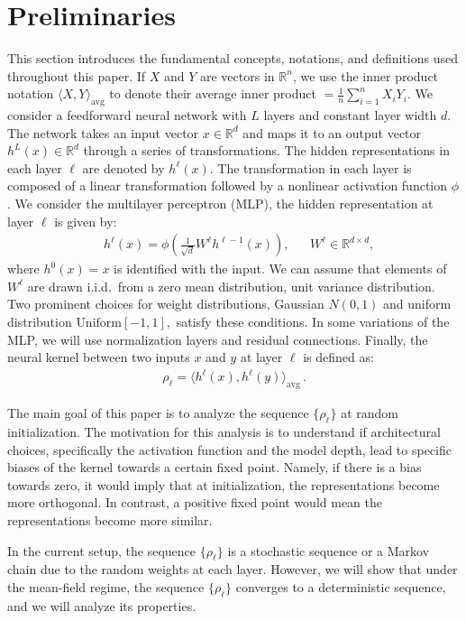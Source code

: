 \documentclass[twoside]{article}
\newcommand{\avg}{\text{avg}}
\theoremstyle{definition}
\begin{document}
\section{Preliminaries}
This section introduces the fundamental concepts, notations, and definitions used throughout this paper. 
If $X$ and $Y$ are vectors in $\mathbb{R}^n$, we use the inner product notation $\langle X, Y \rangle_\avg$ to denote their average inner product $ = \frac{1}{n} \sum_{i=1}^n X_i Y_i.$  We consider a feedforward neural network with $L$ layers and constant layer width $d$. The network takes an input vector $x \in \mathbb{R}^d$ and maps it to an output vector $h^L(x) \in \mathbb{R}^d$ through a series of transformations. The hidden representations in each layer $\ell$ are denoted by $h^\ell(x)$. The transformation in each layer is composed of a linear transformation followed by a nonlinear activation function $\phi$. We consider the multilayer perceptron (MLP), the hidden representation at layer $\ell$ is given by:
\begin{align}
& h^\ell(x) = \phi\left(\frac{1}{\sqrt{d}}W^\ell h^{\ell-1}(x)\right), && W^\ell \in \mathbb{R}^{d \times d},
\end{align}
where $h^0(x)=x$ is identified with the input. We can assume that elements of $W^\ell$ are drawn i.i.d.~from a zero mean distribution, unit variance distribution. Two prominent choices for weight distributions, Gaussian $N(0,1)$ and uniform distribution $\text{Uniform}[-1,1],$ satisfy these conditions. In some variations of the MLP, we will use normalization layers and residual connections. Finally, the neural kernel between two inputs $x$ and $y$ at layer $\ell$ is defined as:
\begin{align}
    \rho_\ell = \langle h^\ell(x), h^\ell(y) \rangle_\avg \,.
\end{align}

The main goal of this paper is to analyze the sequence $\{\rho_\ell\}$ at random initialization. The motivation for this analysis is to understand if architectural choices, specifically the activation function and the model depth, lead to specific biases of the kernel towards a certain fixed point. Namely, if there is a bias towards zero, it would imply that at initialization, the representations become more orthogonal. In contrast, a positive fixed point would mean the representations become more similar.

In the current setup, the sequence $\{\rho_\ell\}$ is a stochastic sequence or a Markov chain due to the random weights at each layer. However, we will show that under the mean-field regime, the sequence $\{\rho_\ell\}$ converges to a deterministic sequence, and we will analyze its properties.
\end{document}
